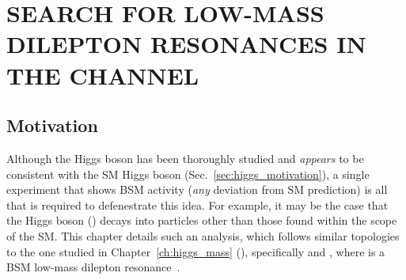 \chapter{SEARCH FOR LOW-MASS DILEPTON RESONANCES IN THE \texorpdfstring{\htofourl}{H TO 4l} CHANNEL}
\label{ch:dilep_res}

\section{Motivation}
Although the Higgs boson has been thoroughly studied and \emph{appears} to be consistent with the SM Higgs boson (Sec.~\ref{sec:higgs_motivation}), a single experiment that shows BSM activity (\ie \emph{any} deviation from SM prediction) is all that is required to defenestrate this idea.
For example, it may be the case that the Higgs boson (\PH) decays into particles other than those found within the scope of the SM.
This chapter details such an analysis, which follows similar topologies to the one studied in Chapter~\ref{ch:higgs_mass} (\hzzfourl), specifically \hzxfourl and \hxxfourl, where \PX is a BSM low-mass dilepton resonance~\cite{CMS:2021pcy}.